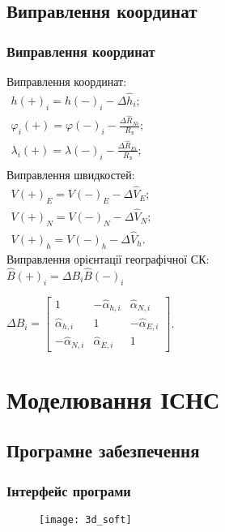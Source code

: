 \documentclass[ucs,compress]{beamer}    %
\begin{document}
\subsection{Виправлення координат} 
\begin{frame}%
\frametitle{Виправлення координат}
Виправлення координат:\\
$\begin{array}{l} 
{h(+)_{i} =h(-)_{i} -\Delta \hat{h}_{i} ;} \\ 
{\varphi_{i}(+) =\varphi (-)_{i} -\frac{\Delta \hat{R}_{Ni} }{R_{\text{З}} } ;} \\ 
{\lambda_{i}(+) =\lambda (-)_{i} -\frac{\Delta \hat{R}_{Ei} }{R_{\text{З}} } ;} \\ 
\end{array} $\\
Виправлення швидкостей:\\
$\begin{array}{l}
{V(+)_{E}=V(-)_{E} -\Delta \hat{V}_{E}; } \\
{V(+)_{N}=V(-)_{N} -\Delta \hat{V}_{N}; } \\
{V(+)_{h}=V(-)_{h} -\Delta \hat{V}_{h}. } 
\end{array} $\\
Виправлення орієнтації географічної СК:\\
$\hat{B}(+)_{i} =\Delta B_{i} \hat{B}(-)_{i}$

$\Delta B_{i} =\left[\begin{array}{ccc} 
{1} & {-\hat{\alpha }_{h,i} } & {\hat{\alpha }_{N,i} }\\ 
{\hat{\alpha }_{h,i} } & {1} & {-\hat{\alpha }_{E,i} }\\ 
{-\hat{\alpha }_{N,i} } & {\hat{\alpha }_{E,i} } & {1} \end{array}\right]$.                                              
%  

\end{frame}

\section{Моделювання ІСНС} 
\subsection{Програмне забезпечення} 
\begin{frame}%
\frametitle{Інтерфейс програми}
\begin{figure}
\centering
\texttt{[image: 3d\_soft]}
\end{figure}
\end{frame}
\end{document}
